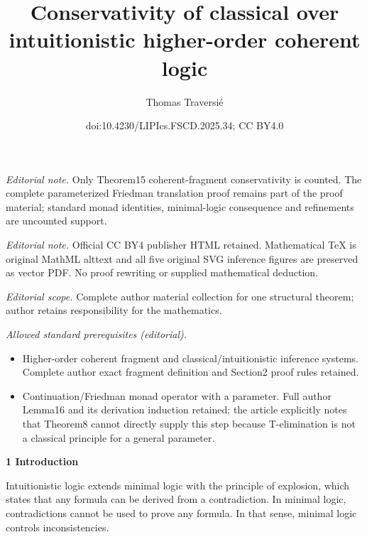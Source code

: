 \documentclass[10pt,a4paper]{article}
\title{Conservativity of classical over intuitionistic higher-order coherent logic}
\author{Thomas Traversié}
\date{doi:10.4230/LIPIcs.FSCD.2025.34; CC BY4.0}
\begin{document}
\maketitle
\noindent\textit{Editorial note.} Only Theorem15 coherent-fragment conservativity is counted. The complete parameterized Friedman translation proof remains part of the proof material; standard monad identities, minimal-logic consequence and refinements are uncounted support.\par\medskip
\noindent\textit{Editorial note.} Official CC BY4 publisher HTML retained. Mathematical TeX is original MathML alttext and all five original SVG inference figures are preserved as vector PDF. No proof rewriting or supplied mathematical deduction.\par\medskip
\noindent\textit{Editorial scope.} Complete author material collection for one structural theorem; author retains responsibility for the mathematics.\par\medskip
\noindent\textit{Allowed standard prerequisites (editorial).}\begin{itemize}
\item Higher-order coherent fragment and classical/intuitionistic inference systems. Complete author exact fragment definition and Section2 proof rules retained.
\item Continuation/Friedman monad operator with a parameter. Full author Lemma16 and its derivation induction retained; the article explicitly notes that Theorem8 cannot directly supply this step because T-elimination is not a classical principle for a general parameter.
\end{itemize}\medskip

 
\par\medskip\noindent\textbf{1 Introduction}\par
 
 
Intuitionistic logic extends minimal logic with the principle of explosion, which states that any formula can be derived from a contradiction. In minimal logic, contradictions cannot be used to prove any formula. In that sense, minimal logic controls inconsistencies.\par
 
\begin{center}\end{center}
 
\end{document}
